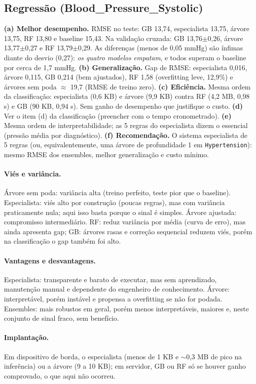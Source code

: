 \documentclass[11pt,a4paper]{article}
\begin{document}
\subsection*{Regressão (Blood\_Pressure\_Systolic)}
\textbf{(a) Melhor desempenho.} RMSE no teste: GB 13,74, especialista 13,75, árvore 13,75, RF 13,80 e baseline 15,43.
Na validação cruzada: GB 13,76$\pm$0,26, árvore 13,77$\pm$0,27 e RF 13,79$\pm$0,29. As diferenças (menos de 0,05 mmHg) são ínfimas diante do desvio (0,27): \emph{os quatro modelos empatam}, e todos superam o baseline por cerca de 1,7 mmHg.
\textbf{(b) Generalização.} Gap de RMSE: especialista 0,016, árvore 0,115, GB 0,214 (bem ajustados), RF 1,58 (overfitting leve, 12,9\%) e árvores sem poda $\approx$ 19,7 (RMSE de treino zero).
\textbf{(c) Eficiência.} Mesma ordem da classificação: especialista (0,6 KB) e árvore (9,9 KB) contra RF (4,2 MB, 0,98 s) e GB (90 KB, 0,94 s). Sem ganho de desempenho que justifique o custo.
\textbf{(d)} Ver o item (d) da classificação (preencher com o tempo cronometrado). \textbf{(e)} Mesma ordem de interpretabilidade; as 5 regras do especialista dizem o essencial (pressão média por diagnóstico). 
\textbf{(f) Recomendação.} O sistema especialista de 5 regras (ou, equivalentemente, uma árvore de profundidade 1 em \texttt{Hypertension}): mesmo RMSE dos ensembles, melhor generalização e custo mínimo.

\paragraph{Viés e variância.} Árvore sem poda: variância alta (treino perfeito, teste pior que o baseline). Especialista: viés alto por construção (poucas regras), mas com variância praticamente nula; aqui isso basta porque o sinal é simples. Árvore ajustada: compromisso intermediário.
RF: reduz variância por média (curva de erro), mas ainda apresenta gap; GB: árvores rasas e correção sequencial reduzem viés, porém na classificação o gap também foi alto.
\paragraph{Vantagens e desvantagens.} Especialista: transparente e barato de executar, mas sem aprendizado, manutenção manual e dependente do engenheiro de conhecimento. Árvore: interpretável, porém instável e propensa a overfitting se não for podada. Ensembles: mais robustos em geral, porém menos interpretáveis, maiores e, neste conjunto de sinal fraco, sem benefício.
\paragraph{Implantação.} Em dispositivo de borda, o especialista (menos de 1 KB e $\sim$0,3 MB de pico na inferência) ou a árvore (9 a 10 KB); em servidor, GB ou RF só se houver ganho comprovado, o que aqui não ocorreu.
\end{document}
